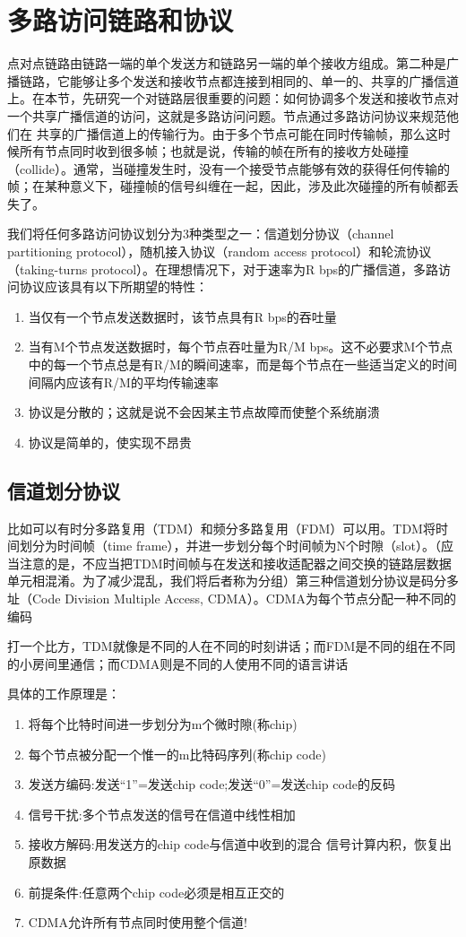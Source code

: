 \documentclass[]{report}
\begin{document}
	\section{多路访问链路和协议}
	点对点链路由链路一端的单个发送方和链路另一端的单个接收方组成。第二种是广播链路，它能够让多个发送和接收节点都连接到相同的、单一的、共享的广播信道上。在本节，先研究一个对链路层很重要的问题：如何协调多个发送和接收节点对一个共享广播信道的访问，这就是多路访问问题。节点通过多路访问协议来规范他们在 共享的广播信道上的传输行为。由于多个节点可能在同时传输帧，那么这时候所有节点同时收到很多帧；也就是说，传输的帧在所有的接收方处碰撞（collide）。通常，当碰撞发生时，没有一个接受节点能够有效的获得任何传输的帧；在某种意义下，碰撞帧的信号纠缠在一起，因此，涉及此次碰撞的所有帧都丢失了。\par
	我们将任何多路访问协议划分为3种类型之一：信道划分协议（channel partitioning protocol），随机接入协议（random access protocol）和轮流协议（taking-turns protocol）。在理想情况下，对于速率为R bps的广播信道，多路访问协议应该具有以下所期望的特性：
	\begin{enumerate}
		\item 当仅有一个节点发送数据时，该节点具有R bps的吞吐量
		\item 当有M个节点发送数据时，每个节点吞吐量为R/M bps。这不必要求M个节点中的每一个节点总是有R/M的瞬间速率，而是每个节点在一些适当定义的时间间隔内应该有R/M的平均传输速率
		\item 协议是分散的；这就是说不会因某主节点故障而使整个系统崩溃
		\item 协议是简单的，使实现不昂贵
	\end{enumerate}
		\subsection{信道划分协议}
		比如可以有时分多路复用（TDM）和频分多路复用（FDM）可以用。TDM将时间划分为时间帧（time frame），并进一步划分每个时间帧为N个时隙（slot）。（应当注意的是，不应当把TDM时间帧与在发送和接收适配器之间交换的链路层数据单元相混淆。为了减少混乱，我们将后者称为分组）第三种信道划分协议是码分多址（Code Division Multiple Access, CDMA）。CDMA为每个节点分配一种不同的编码\par
		打一个比方，TDM就像是不同的人在不同的时刻讲话；而FDM是不同的组在不同的小房间里通信；而CDMA则是不同的人使用不同的语言讲话\par
		具体的工作原理是：
		\begin{enumerate}
			\item 将每个比特时间进一步划分为m个微时隙(称chip)
			\item 每个节点被分配一个惟一的m比特码序列(称chip code)
			\item 发送方编码:发送“1”=发送chip code;发送“0”=发送chip code的反码
			\item 信号干扰:多个节点发送的信号在信道中线性相加
			\item 接收方解码:用发送方的chip code与信道中收到的混合 信号计算内积，恢复出原数据
			\item 前提条件:任意两个chip code必须是相互正交的
			\item CDMA允许所有节点同时使用整个信道!
		\end{enumerate}
\end{document}
